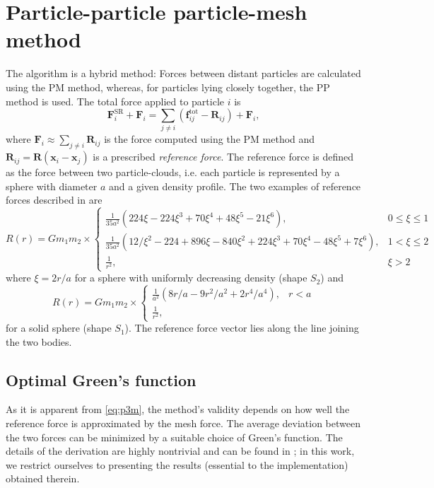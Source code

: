 \section{Particle-particle particle-mesh method}
The \PThreeM{} algorithm is a hybrid method:
Forces between distant particles are calculated using the PM method, whereas, for particles lying closely together, the PP method is used.
The total force applied to particle $i$ is
\begin{equation}\label{eq:p3m}
    \mathbf{F}_i^\text{SR} + \mathbf{F}_i = \sum_{j \neq i}(\mathbf{f}_{ij}^\text{tot} - \mathbf{R}_{ij}) + \mathbf{F}_i,
\end{equation}
where $\mathbf{F}_i \approx \sum_{j\neq i} \mathbf{R}_{ij}$ is the force computed using the PM method and $\mathbf{R}_{ij} = \mathbf{R}(\mathbf{x}_i - \mathbf{x}_j)$ is a prescribed \textit{reference force}.
The reference force is defined as the force between two particle-clouds, i.e. each particle is represented by a sphere with diameter $a$ and a given density profile.
The two examples of reference forces described in \cite{Hockney1988} are
\begin{equation*}
    R(r) =
    G m_1 m_2 \times\begin{cases}
        \frac{1}{35 a^2} (224 \xi - 224 \xi^3 + 70 \xi^4 + 48 \xi^5 - 21 \xi^6),                               & 0 \leq \xi \leq 1 \\
        \frac{1}{35 a^2} (12 / \xi^2 - 224 + 896 \xi - 840 \xi^2 + 224 \xi^3 + 70 \xi^4 - 48 \xi^5 + 7 \xi^6), & 1 < \xi \leq 2    \\
        \frac{1}{r^2},                                                                                         & \xi > 2
    \end{cases}
\end{equation*}
where $\xi = 2r/a$ for a sphere with uniformly decreasing density (shape $S_2$) and
\begin{equation}\label{eq:s1-reference-force}
    R(r) =
    G m_1 m_2 \times\begin{cases}
        \frac{1}{a^2} (8 r / a - 9 r^2 / a^2 + 2 r^4 / a^4), & r < a \\
        \frac{1}{r^2},
    \end{cases}
\end{equation}
for a solid sphere (shape $S_1$).
The reference force vector lies along the line joining the two bodies.

\subsection{Optimal Green's function}
As it is apparent from \autoref{eq:p3m}, the method's validity depends on how well the reference force is approximated by the mesh force.
The average deviation between the two forces can be minimized by a suitable choice of Green's function.
The details of the derivation are highly nontrivial and can be found in \cite{Hockney1988};
in this work, we restrict ourselves to presenting the results (essential to the implementation) obtained therein.

